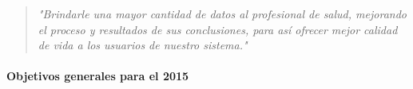 \begin{quote}
\small \textit{ "Brindarle una mayor cantidad de datos al profesional de salud, mejorando el proceso y resultados de sus conclusiones, para así ofrecer mejor calidad de vida a los usuarios de nuestro sistema."}
 \end{quote}

\paragraph{Objetivos generales para el 2015} 
 
